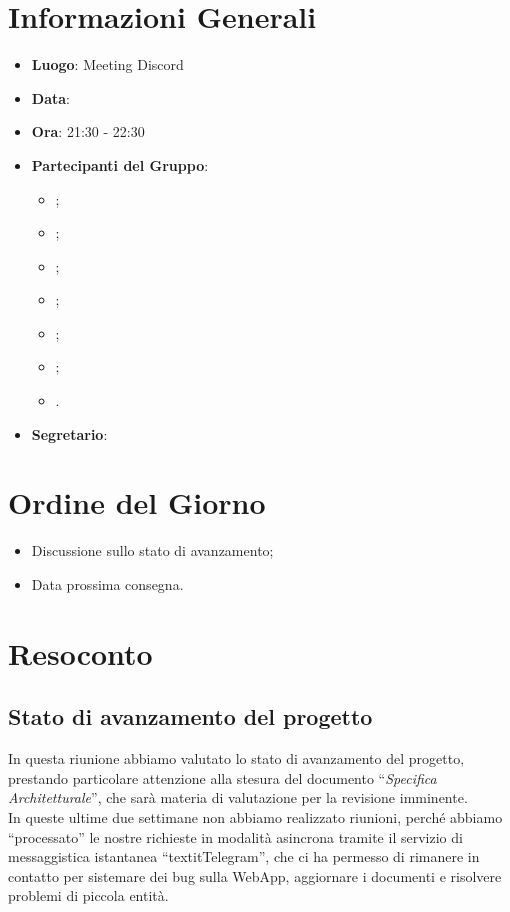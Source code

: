\section{Informazioni Generali}

\begin{itemize}
	\item{\textbf{Luogo}}: Meeting Discord
	\item{\textbf{Data}}: \D
	\item{\textbf{Ora}}: 21:30 - 22:30
	\item{\textbf{Partecipanti del Gruppo}}:
	\begin{itemize}
		\item{\EP{};}
		\item{\FP{};}
		\item{\GC{};}
		\item{\LW{};}
		\item{\MG{};}
		\item{\MG{};}
		\item{\PV{}.}
	\end{itemize}
	\item{\textbf{Segretario}}: \GC{}
\end{itemize}

\section{Ordine del Giorno}
\begin{itemize}
	\item{Discussione sullo stato di avanzamento;}
	\item{Data prossima consegna.}
\end{itemize}

\section{Resoconto}

\subsection{Stato di avanzamento del progetto}

In questa riunione abbiamo valutato lo stato di avanzamento del progetto, prestando particolare attenzione alla stesura del documento “\textit{Specifica Architetturale}”, che sarà materia di valutazione per la revisione imminente.
\\
In queste ultime due settimane non abbiamo realizzato riunioni, perché abbiamo “processato” le nostre richieste in modalità asincrona tramite il servizio di messaggistica istantanea “textit{Telegram}”, che ci ha permesso di rimanere in contatto per sistemare dei bug sulla WebApp, aggiornare i documenti e risolvere problemi di piccola entità. 

